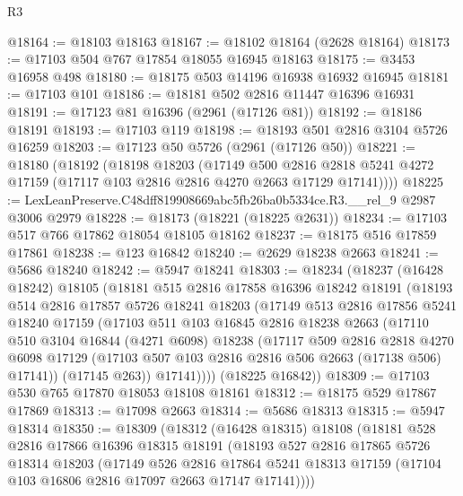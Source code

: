 \begin{lexlean}{R3}
\begin{coremodule}
@18164 := @18103 @18163
@18167 := @18102 @18164 (@2628 @18164)
@18173 := @17103 @504 @767 @17854 @18055 @16945 @18163
@18175 := @3453 @16958 @498
@18180 := @18175 @503 @14196 @16938 @16932 @16945
@18181 := @17103 @101
@18186 := @18181 @502 @2816 @11447 @16396 @16931
@18191 := @17123 @81 @16396 (@2961 (@17126 @81))
@18192 := @18186 @18191
@18193 := @17103 @119
@18198 := @18193 @501 @2816 @3104 @5726 @16259
@18203 := @17123 @50 @5726 (@2961 (@17126 @50))
@18221 := @18180
    (@18192
      (@18198
        @18203
        (@17149
          @500
          @2816
          @2818
          @5241
          @4272
          @17159
          (@17117 @103 @2816 @2816 @4270 @2663 @17129 @17141))))
@18225 := LexLeanPreserve.C48dff819908669abc5fb26ba0b5334ce.R3.__rel_9 @2987 @3006 @2979
@18228 := @18173 (@18221 (@18225 @2631))
@18234 := @17103 @517 @766 @17862 @18054 @18105 @18162
@18237 := @18175 @516 @17859 @17861
@18238 := @123 @16842
@18240 := @2629 @18238 @2663
@18241 := @5686 @18240
@18242 := @5947 @18241
@18303 := @18234
    (@18237
      (@16428 @18242)
      @18105
      (@18181
        @515
        @2816
        @17858
        @16396
        @18242
        @18191
        (@18193
          @514
          @2816
          @17857
          @5726
          @18241
          @18203
          (@17149
            @513
            @2816
            @17856
            @5241
            @18240
            @17159
            (@17103
              @511
              @103
              @16845
              @2816
              @18238
              @2663
              (@17110
                @510
                @3104
                @16844
                (@4271 @6098)
                @18238
                (@17117
                  @509
                  @2816
                  @2818
                  @4270
                  @6098
                  @17129
                  (@17103 @507 @103 @2816 @2816 @506 @2663 (@17138 @506) @17141))
                (@17145 @263))
              @17141))))
      (@18225 @16842))
@18309 := @17103 @530 @765 @17870 @18053 @18108 @18161
@18312 := @18175 @529 @17867 @17869
@18313 := @17098 @2663
@18314 := @5686 @18313
@18315 := @5947 @18314
@18350 := @18309
    (@18312
      (@16428 @18315)
      @18108
      (@18181
        @528
        @2816
        @17866
        @16396
        @18315
        @18191
        (@18193
          @527
          @2816
          @17865
          @5726
          @18314
          @18203
          (@17149
            @526
            @2816
            @17864
            @5241
            @18313
            @17159
            (@17104 @103 @16806 @2816 @17097 @2663 @17147 @17141))))

\end{coremodule}
\end{lexlean}
